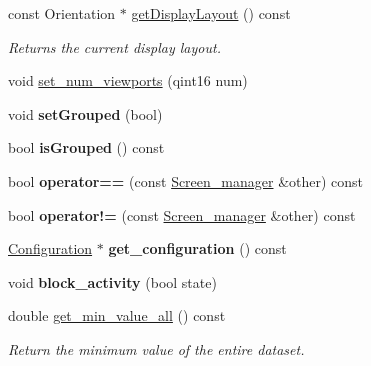 \begin{DoxyCompactItemize}
const Orientation $\ast$ \mbox{\hyperlink{classScreen__manager_a6c41fbe3b06a11879010f8cce4488953}{get\+Display\+Layout}} () const
\begin{DoxyCompactList}\small\item\em Returns the current display layout. \end{DoxyCompactList}\item 
\mbox{\label{classScreen__manager_a15f0b7a953e3a15c46ccff31681f2c8d}} 
void \mbox{\hyperlink{classScreen__manager_a15f0b7a953e3a15c46ccff31681f2c8d}{set\+\_\+num\+\_\+viewports}} (qint16 num)
\item 
\mbox{\label{classScreen__manager_ad86ad708eacc70d09ddfea3991c1436a}} 
void {\bfseries set\+Grouped} (bool)
\item 
\mbox{\label{classScreen__manager_a1e9502d390457183eb1924753c3ffbaa}} 
bool {\bfseries is\+Grouped} () const
\item 
\mbox{\label{classScreen__manager_a491fb46b4eb96fb363848a1c506528bd}} 
bool {\bfseries operator==} (const \mbox{\hyperlink{classScreen__manager}{Screen\+\_\+manager}} \&other) const
\item 
\mbox{\label{classScreen__manager_a5f6269a00491d2dd64f4da8506f37d2f}} 
bool {\bfseries operator!=} (const \mbox{\hyperlink{classScreen__manager}{Screen\+\_\+manager}} \&other) const
\item 
\mbox{\label{classScreen__manager_a78723343009e85b288d800d9cc19bf80}} 
\mbox{\hyperlink{classConfiguration}{Configuration}} $\ast$ {\bfseries get\+\_\+configuration} () const
\item 
\mbox{\label{classScreen__manager_aad35e109d8d77378eb94605d10426a6f}} 
void {\bfseries block\+\_\+activity} (bool state)
\item 
\mbox{\label{classScreen__manager_ac859de377f3ac1b7f18a9be9a21c193b}} 
double \mbox{\hyperlink{classScreen__manager_ac859de377f3ac1b7f18a9be9a21c193b}{get\+\_\+min\+\_\+value\+\_\+all}} () const
\begin{DoxyCompactList}\small\item\em Return the minimum value of the entire dataset. \end{DoxyCompactList}\item 

\end{DoxyCompactItemize}
